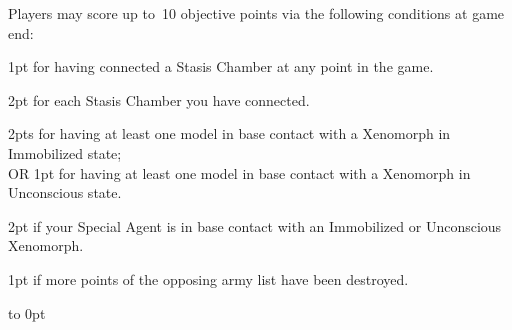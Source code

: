 \vspace*{-4pt}
Players may score up to~10 objective points via the following
conditions at game end:
\begin{squishitemize}
\item 1pt for having connected a Stasis Chamber at any point in the game.
\item 2pt for each Stasis Chamber you have connected.
\item 2pts for having at least one model in base contact with a
  Xenomorph in Immobilized state;\\
  OR 1pt for having at least one model in base contact with a
  Xenomorph in Unconscious state.
\item 2pt if your Special Agent is in base contact with an
  Immobilized or Unconscious Xenomorph.

\item 1pt if more points of the opposing army list have been destroyed.
\end{squishitemize}

\vfill
\vbox to 0pt{}